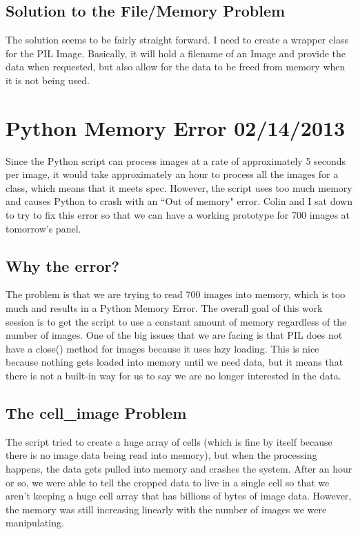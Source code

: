 \documentclass[]{article}
\begin{document}
		\subsection{Solution to the File/Memory Problem}
			The solution seems to be fairly straight forward. I need to create a wrapper class for the PIL Image. Basically, it will hold a filename of an Image and provide the data when requested, but also allow for the data to be freed from memory when it is not being used. 
			
	\section{Python Memory Error 02/14/2013}
		Since the Python script can process images at a rate of approximately 5 seconds per image, it would take approximately an hour to process all the images for a class, which means that it meets spec. However, the script uses too much memory and causes Python to crash with an ``Out of memory" error. Colin and I sat down to try to fix this error so that we can have a working prototype for 700 images at tomorrow's panel. 
		
		\subsection{Why the error?}
			The problem is that we are trying to read 700 images into memory, which is too much and results in a Python Memory Error. The overall goal of this work session is to get the script to use a constant amount of memory regardless of the number of images. One of the big issues that we are facing is that PIL does not have a close() method for images because it uses lazy loading. This is nice because nothing gets loaded into memory until we need data, but it means that there is not a built-in way for us to say we are no longer interested in the data.
			
		\subsection{The cell\_image Problem}
			The script tried to create a huge array of cells (which is fine by itself because there is no image data being read into memory), but when the processing happens, the data gets pulled into memory and crashes the system. After an hour or so, we were able to tell the cropped data to live in a single cell so that we aren't keeping a huge cell array that has billions of bytes of image data. However, the memory was still increasing linearly with the number of images we were manipulating.
			
\end{document}

